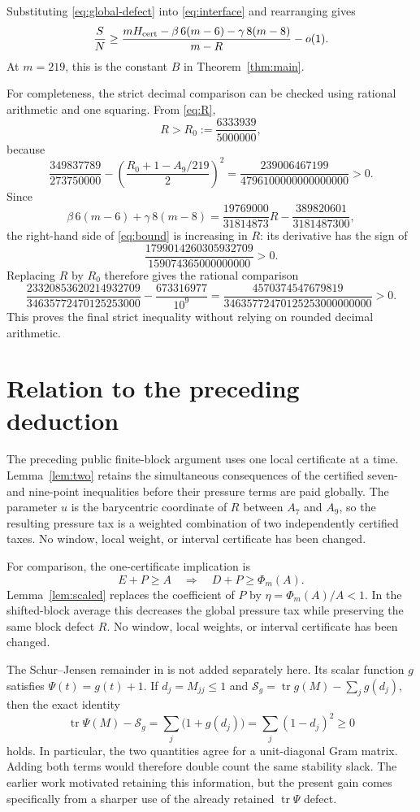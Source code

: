 \documentclass[11pt]{amsart}
\theoremstyle{remark}
\DeclareMathOperator{\tr}{tr}
\begin{document}
Substituting \eqref{eq:global-defect} into \eqref{eq:interface} and
rearranging gives
\begin{equation}\label{eq:bound}
 \frac SN\ge
 \frac{mH_{\rm cert}-\beta\,6(m-6)-\gamma\,8(m-8)}{m-R}-o(1).
\end{equation}
At $m=219$, this is the constant $B$ in Theorem~\ref{thm:main}.

For completeness, the strict decimal comparison can be checked using
rational arithmetic and one squaring.  From \eqref{eq:R},
\[
 R>R_0:=\frac{6333939}{5000000},
\]
because
\[
 \frac{349837789}{273750000}
 -\left(\frac{R_0+1-A_9/219}{2}\right)^2
 =\frac{239006467199}{4796100000000000000}>0.
\]
Since
\[
 \beta\,6(m-6)+\gamma\,8(m-8)
 =\frac{19769000}{31814873}R-\frac{389820601}{3181487300},
\]
the right-hand side of \eqref{eq:bound} is increasing in $R$: its derivative
has the sign of
\[
 \frac{1799014260305932709}{159074365000000000}>0.
\]
Replacing $R$ by $R_0$ therefore gives the rational comparison
\[
 \frac{23320853620214932709}{34635772470125253000}
 -\frac{673316977}{10^9}
 =\frac{4570374547679819}{34635772470125253000000000}>0.
\]
This proves the final strict inequality without relying on rounded decimal
arithmetic.

\section{Relation to the preceding deduction}

The preceding public finite-block argument uses one local certificate at a
time.  Lemma~\ref{lem:two} retains the simultaneous consequences of the
certified seven- and nine-point inequalities before their pressure terms are
paid globally.  The parameter $u$ is the barycentric coordinate of $R$
between $A_7$ and $A_9$, so the resulting pressure tax is a weighted
combination of two independently certified taxes.  No window, local weight,
or interval certificate has been changed.

For comparison, the one-certificate implication is
\[
 E+P\ge A\quad\Longrightarrow\quad
 D+P\ge\Phi_m(A).
\]
Lemma~\ref{lem:scaled} replaces the coefficient of $P$ by
$\eta=\Phi_m(A)/A<1$.  In the shifted-block average this decreases the
global pressure tax while preserving the same block defect $R$.  No window,
local weights, or interval certificate has been changed.

The Schur--Jensen remainder in \cite{Shi2026} is not added separately here.
Its scalar function $g$ satisfies $\Psi(t)=g(t)+1$.  If
$d_j=M_{jj}\le1$ and
\(
 \mathcal S_g=\tr g(M)-\sum_jg(d_j),
\)
then the exact identity
\[
 \tr\Psi(M)-\mathcal S_g
 =\sum_j\bigl(1+g(d_j)\bigr)
 =\sum_j(1-d_j)^2\ge0
\]
holds.  In particular, the two quantities agree for a unit-diagonal Gram
matrix.
Adding both terms would therefore double count the same stability slack.
The earlier work motivated retaining this information, but the present gain
comes specifically from a sharper use of the already retained
$\tr\Psi$ defect.
\end{document}

